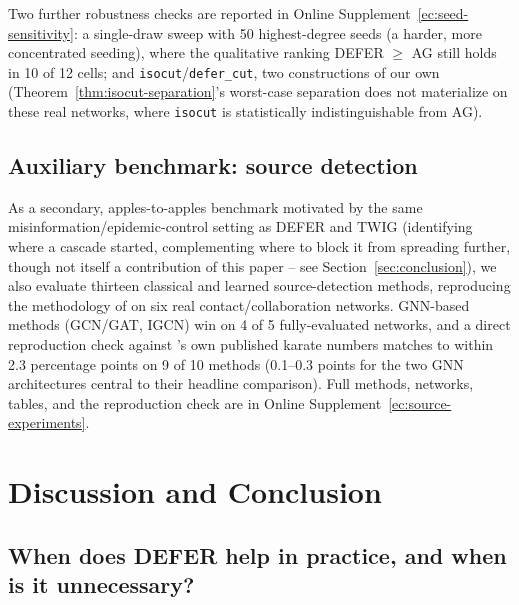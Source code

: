 \documentclass[ijoc,sglanonrev]{informs4}
\begin{document}
Two further robustness checks are reported in
Online Supplement~\ref{ec:seed-sensitivity}: a single-draw sweep with 50
highest-degree seeds (a harder, more concentrated seeding), where the
qualitative ranking DEFER $\ge$ AG still holds in 10 of 12 cells; and
\texttt{isocut}/\texttt{defer\_cut}, two constructions of our own
(Theorem~\ref{thm:isocut-separation}'s worst-case separation does not
materialize on these real networks, where \texttt{isocut} is
statistically indistinguishable from AG).

\subsection{Auxiliary benchmark: source detection}\label{sec:source-experiments}

As a secondary, apples-to-apples benchmark motivated by the same
misinformation/epidemic-control setting as DEFER and TWIG (identifying
where a cascade started, complementing where to block it from spreading
further, though not itself a contribution of this paper -- see
Section~\ref{sec:conclusion}), we also evaluate thirteen classical and
learned source-detection methods, reproducing the methodology of
\citet{sterchi2026} on six real contact/collaboration networks. GNN-based
methods (GCN/GAT, IGCN) win on 4 of 5 fully-evaluated networks, and a
direct reproduction check against \citet{sterchi2026}'s own published
karate numbers matches to within 2.3 percentage points on 9 of 10 methods
(0.1--0.3 points for the two GNN architectures central to their headline
comparison). Full methods, networks, tables, and the reproduction check
are in Online Supplement~\ref{ec:source-experiments}.

\section{Discussion and Conclusion}\label{sec:discussion}

\subsection{When does DEFER help in practice, and when is it unnecessary?}
\end{document}
